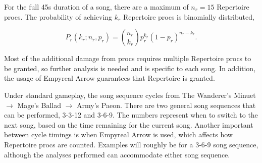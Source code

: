 For the full 45s duration of a song, there are a maximum of $n_r = 15$ Repertoire procs. The probability of achieving $k_r$ Repertoire procs is binomially distributed,

\begin{equation}
    P_r(k_r; n_r, p_r) = \binom{n_r}{k_r} p_r^{k_r} (1-p_r)^{n_r-k_r}.
    \label{eqn:rep-proc-distribution}
\end{equation}

Most of the additional damage from procs requires multiple Repertoire procs to be granted, so further analysis is needed and is specific to each song. In addition, the usage of Empyreal Arrow guarantees that Repertoire is granted.

Under standard gameplay, the song sequence cycles from The Wanderer's Minuet $\rightarrow$ Mage's Ballad $\rightarrow$ Army's Paeon. There are two general song sequences that can be performed, 3-3-12 and 3-6-9. The numbers represent when to switch to the next song, based on the time remaining for the current song. Another important between cycle timings is when Empyreal Arrow is used, which affects how Repertoire procs are counted. Examples will roughly be for a 3-6-9 song sequence, although the analyses performed can accommodate either song sequence.